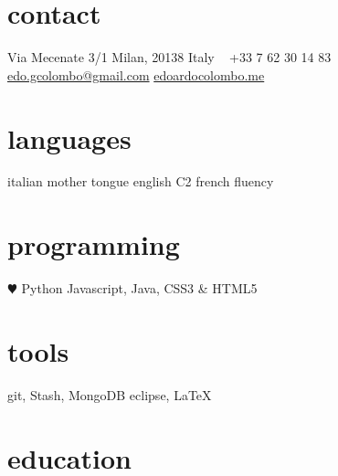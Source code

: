 \documentclass[]{friggeri-cv} %
\begin{document}


\begin{aside} %
\section{contact}
Via Mecenate 3/1
Milan, 20138
Italy
~
+33 7 62 30 14 83
~
\href{mailto:edo.gcolombo@gmail.com}{edo.gcolombo@gmail.com}
\href{http://edoardocolombo.me}{edoardocolombo.me}
\section{languages}
italian mother tongue
english C2
french fluency
\section{programming}
{\color{red} $\varheartsuit$} Python
Javascript, Java,
CSS3 \& HTML5
\section{tools}
git, Stash, MongoDB
eclipse, \LaTeX
\end{aside}


\section{education}
\end{document}
